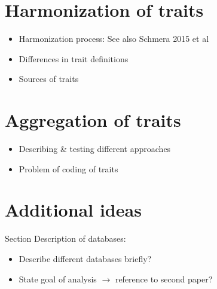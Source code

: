 \documentclass{article}
\begin{document}
\section{Harmonization of traits}

\begin{itemize}
    \item Harmonization process: See also Schmera 2015 et al 
    \item Differences in trait definitions
    \item Sources of traits
\end{itemize}

\section{Aggregation of traits}

\begin{itemize}
    \item Describing \& testing different approaches
    \item Problem of coding of traits
\end{itemize}

\section*{Additional ideas}

Section Description of databases:
\begin{itemize}
    \item Describe different databases briefly?
    \item State goal of analysis $\rightarrow$ reference to second paper?
\end{itemize}
\end{document}
